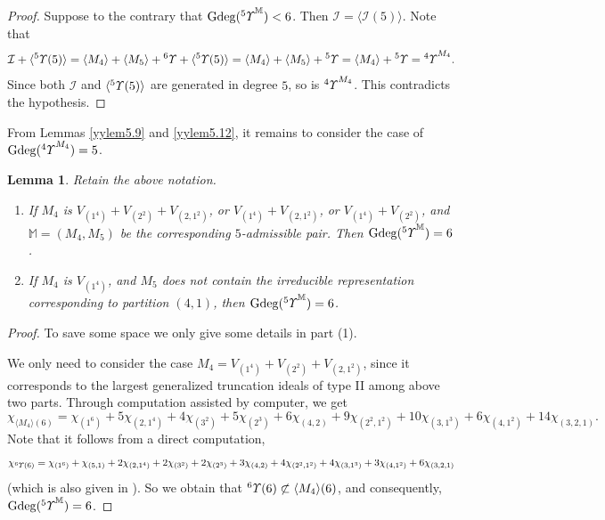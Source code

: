 \documentclass{amsart}
\newtheorem{lem}[thm]{Lemma}
\theoremstyle{definition}
\theoremstyle{remark}
\numberwithin{equation}{section}
\def\gd{\operatorname{Gdeg}}
\newcommand{\lr}[1]{\langle #1 \rangle}
\newcommand{\up}[1]{{^{#1}{\it \!\Upsilon}}}
\newcommand{\upa}[1]{{^{#1}{\it \!\Upsilon}}}
\def \I{\mathcal{I}}
\begin{document}
\begin{proof}
 Suppose to the contrary that $\gd(\upa{5}^{\mathbb M})<6$.
Then $\I=\lr{\I(5)}$. Note that 
$$\I+\lr{\up{5}(5)}=
\lr{M_4}+\lr{M_5}+\up{6}+\lr{\up{5}(5)}=\lr{M_4}+\lr{M_5}+\up{5}
=\lr{M_4}+\up{5}=\up{4}^{M_4}.$$
Since both $\I$ and $\lr{\up{5}(5)}$ are generated in degree
$5$, so is $\up{4}^{M_4}$. This contradicts the hypothesis.
\end{proof}

From Lemmas	\ref{yylem5.9} and	\ref{yylem5.12}, it remains  
to consider the case of $\gd(\up{4}^{M_4})=5$.

\begin{lem}
\label{yylem5.13}
Retain the above notation.
\begin{enumerate}
\item[(1)]
If $M_4$ is $V_{(1^4)}+V_{(2^2)}+V_{(2,1^2)}$, or 
$V_{(1^4)}+V_{(2,1^2)}$, or $V_{(1^4)}+V_{(2^2)}$, and  
${\mathbb M}=(M_4,M_5)$ be the corresponding $5$-admissible 
pair. Then $\gd(\upa{5}^{\mathbb M})=6$.
\item[(2)]
If $M_4$ is  $V_{(1^4)}$, and  $M_5$ does not contain the 
irreducible representation corresponding to partition 
$(4,1)$, then $\gd(\upa{5}^{\mathbb M})=6$.
\end{enumerate} 		
\end{lem}	

\begin{proof} To save some space we only give some details
in part (1).

We only need to consider the case 
$M_4=V_{(1^4)}+V_{(2^2)}+V_{(2,1^2)}$, since it corresponds 
to the largest generalized truncation ideals of type II 
among above two parts. Through computation assisted by 
computer, we get
\[\chi_{\lr{M_4}(6)}=\chi_{(1^6)}
+5\chi_{(2, 1^4)}+4\chi_{(3^2)}+5\chi_{(2^3)}
+6\chi_{(4, 2)}+9\chi_{(2^2, 1^2)}+10\chi_{(3, 1^3)}
+6\chi_{(4, 1^2)}+14\chi_{(3, 2, 1)}.\]
Note that it follows from a direct 
computation,
\[\chi_{\up{6}(6)}=\chi_{(1^6)}+\chi_{(5, 1)}
+2\chi_{(2, 1^4)}+2\chi_{(3^2)}+2\chi_{(2^3)}
+3\chi_{(4, 2)}+4\chi_{(2^2, 1^2)}+4\chi_{(3, 1^3)}
+3\chi_{(4, 1^2)}+6\chi_{(3, 2, 1)}\]
(which is also given in \cite{JSV}). 
So we obtain that $\up{6}(6)\not\subset \lr{M_4}(6)$, and 
consequently, $\gd(\upa{5}^{\mathbb M})=6$. 	
\end{proof}	
\end{document}
